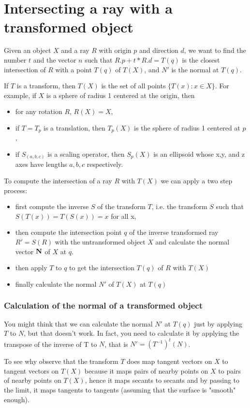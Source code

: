 \documentclass{book}
\newcommand{\vect}[1]{{\bf{ #1}}}
\begin{document}
\section{Intersecting a ray with a transformed object}
Given an object $X$ and a ray $R$ with origin $p$ and direction $d$, we want to find the number $t$ and the vector $n$ such that $R.p + t*R.d = T(q)$ is the closest intersection of $R$ with a point $T(q)$ of $T(X)$, and $N'$ is the normal at $T(q)$.


If $T$ is a transform, then $T(X)$ is the set of all points $\{T(x): x\in X\}$.
For example,
if $X$ is a sphere of radius 1 centered at the origin, then
\begin{itemize}
\item for any rotation $R$,  $R(X) = X$,
\item if $T=T_p$ is a translation, then $T_p(X)$ is the sphere of radius 1 centered at $p$,
\item if $S_{(a,b,c)}$ is a scaling operator, then $S_p(X)$ is an ellipsoid whose
x,y, and z axes have lengths $a,b,c$ respectively.
\end{itemize}

To compute the intersection of a ray $R$ with $T(X)$ we can apply a two step process:
\begin{itemize}
\item first compute the inverse $S$ of the transform $T$, i.e. the transform $S$ such that $S(T(x))=T(S(x))=x$ for all x,
\item then compute the intersection point $q$ of the inverse transformed ray $R'=S(R)$ with the untransformed object $X$
and calculate the normal vector $\vect N$ of $X$ at $q$.
\item then apply $T$ to $q$ to get the intersection $T(q)$ of $R$ with $T(X)$
\item finally calculate the normal $N'$ of $T(X)$ at $T(q)$
\end{itemize}

\subsubsection{Calculation of the normal of a transformed object}
You might think that we can calculate the normal $N'$ at $T(q)$ just by applying $T$ to $N$, but that doesn't work. In fact, you need to calculate it by applying the transpose of the inverse of T to $N$, that is $N' = (T^{-1})^t(N)$.

To see why observe that the transform $T$ does map tangent vectors on $X$ to tangent vectors on $T(X)$ because it maps pairs of nearby points on $X$ to pairs of nearby points on $T(X)$, hence it maps secants to secants and by passing to the limit, it maps tangents to tangents (assuming that the surface is "smooth" enough).
\end{document}
